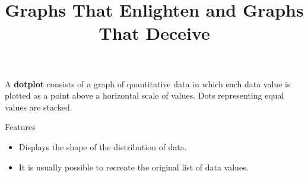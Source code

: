 \documentclass{beamer}
\title[MA205 - Section 2.3]{Graphs That Enlighten and Graphs That Deceive}
\begin{document}
\begin{frame}
\titlepage
\end{frame}

\begin{frame}
\begin{definition}
A \textbf{dotplot} consists of a graph of quantitative data in which each data value is plotted as a point above a horizontal scale of values. Dots representing equal values are stacked.
\end{definition}\pause

\begin{block}{Features}
\begin{itemize}
\item Displays the shape of the distribution of data.
\item It is usually possible to recreate the original list of data values.
\end{itemize}
\end{block}
\end{frame}
\end{document}
